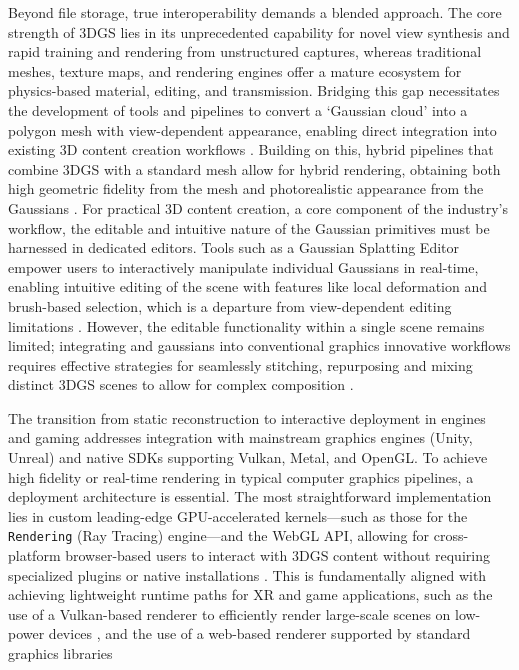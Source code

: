 \documentclass[11pt,a4paper]{article}
\begin{document}
Beyond file storage, true interoperability demands a blended approach. The core strength of 3DGS lies in its unprecedented capability for novel view synthesis and rapid training and rendering from unstructured captures, whereas traditional meshes, texture maps, and rendering engines offer a mature ecosystem for physics-based material, editing, and transmission. Bridging this gap necessitates the development of tools and pipelines to convert a `Gaussian cloud' into a polygon mesh with view-dependent appearance, enabling direct integration into existing 3D content creation workflows \cite{arxiv:2410.11419v1,arxiv:2603.19234v2}. Building on this, hybrid pipelines that combine 3DGS with a standard mesh allow for hybrid rendering, obtaining both high geometric fidelity from the mesh and photorealistic appearance from the Gaussians \cite{arxiv:2509.17083v2}. For practical 3D content creation, a core component of the industry's workflow, the editable and intuitive nature of the Gaussian primitives must be harnessed in dedicated editors. Tools such as a Gaussian Splatting Editor empower users to interactively manipulate individual Gaussians in real-time, enabling intuitive editing of the scene with features like local deformation and brush-based selection, which is a departure from view-dependent editing limitations \cite{arxiv:2403.19632v1}. However, the editable functionality within a single scene remains limited; integrating and gaussians into conventional graphics innovative workflows requires effective strategies for seamlessly stitching, repurposing and mixing distinct 3DGS scenes to allow for complex composition \cite{arxiv:2312.00732v1}.

The transition from static reconstruction to interactive deployment in engines and gaming addresses integration with mainstream graphics engines (Unity, Unreal) and native SDKs supporting Vulkan, Metal, and OpenGL. To achieve high fidelity or real-time rendering in typical computer graphics pipelines, a deployment architecture is essential. The most straightforward implementation lies in custom leading-edge GPU-accelerated kernels---such as those for the \texttt{Rendering} (Ray Tracing) engine---and the WebGL API, allowing for cross-platform browser-based users to interact with 3DGS content without requiring specialized plugins or native installations \cite{arxiv:2607.17842v1}. This is fundamentally aligned with achieving lightweight runtime paths for XR and game applications, such as the use of a Vulkan-based renderer to efficiently render large-scale scenes on low-power devices \cite{arxiv:2308.04079v1}, and the use of a web-based renderer supported by standard graphics libraries \cite{arxiv:2603.11531v1}
\end{document}
